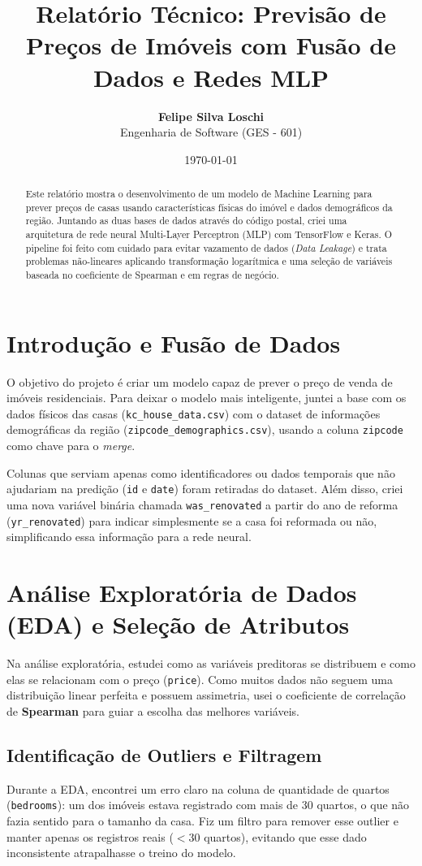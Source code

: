 \documentclass[11pt,a4paper]{article}
\title{\textbf{Relatório Técnico: Previsão de Preços de Imóveis com Fusão de Dados e Redes MLP}}
\author{\textbf{Felipe Silva Loschi} \\ Engenharia de Software (GES - 601)}
\date{\today}
\begin{document}
\maketitle

\begin{abstract}
Este relatório mostra o desenvolvimento de um modelo de Machine Learning para prever preços de casas usando características físicas do imóvel e dados demográficos da região. Juntando as duas bases de dados através do código postal, criei uma arquitetura de rede neural Multi-Layer Perceptron (MLP) com TensorFlow e Keras. O pipeline foi feito com cuidado para evitar vazamento de dados (\textit{Data Leakage}) e trata problemas não-lineares aplicando transformação logarítmica e uma seleção de variáveis baseada no coeficiente de Spearman e em regras de negócio.
\end{abstract}

\section{Introdução e Fusão de Dados}
O objetivo do projeto é criar um modelo capaz de prever o preço de venda de imóveis residenciais. Para deixar o modelo mais inteligente, juntei a base com os dados físicos das casas (\texttt{kc\_house\_data.csv}) com o dataset de informações demográficas da região (\texttt{zipcode\_demographics.csv}), usando a coluna \texttt{zipcode} como chave para o \textit{merge}.

Colunas que serviam apenas como identificadores ou dados temporais que não ajudariam na predição (\texttt{id} e \texttt{date}) foram retiradas do dataset. Além disso, criei uma nova variável binária chamada \texttt{was\_renovated} a partir do ano de reforma (\texttt{yr\_renovated}) para indicar simplesmente se a casa foi reformada ou não, simplificando essa informação para a rede neural.

\section{Análise Exploratória de Dados (EDA) e Seleção de Atributos}
Na análise exploratória, estudei como as variáveis preditoras se distribuem e como elas se relacionam com o preço (\texttt{price}). Como muitos dados não seguem uma distribuição linear perfeita e possuem assimetria, usei o coeficiente de correlação de \textbf{Spearman} para guiar a escolha das melhores variáveis.

\subsection{Identificação de Outliers e Filtragem}
Durante a EDA, encontrei um erro claro na coluna de quantidade de quartos (\texttt{bedrooms}): um dos imóveis estava registrado com mais de 30 quartos, o que não fazia sentido para o tamanho da casa. Fiz um filtro para remover esse outlier e manter apenas os registros reais ($<30$ quartos), evitando que esse dado inconsistente atrapalhasse o treino do modelo.
\end{document}
